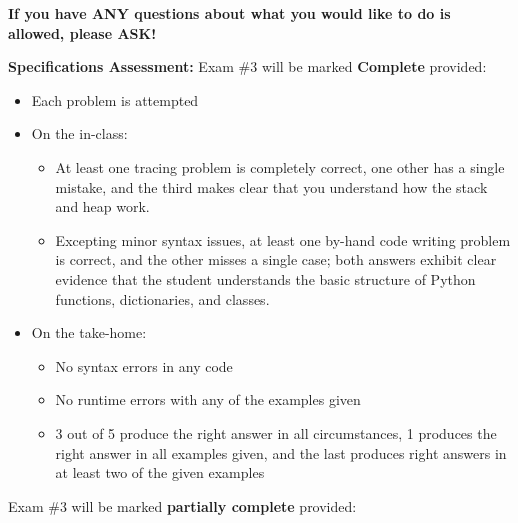 \documentclass{article}
\newcommand{\vs}{\vspace{0.1in}}
\begin{document}
 \vs

 \textbf{If you have ANY questions about what you would like to do is allowed, please ASK!}

 \vs

 \vs


\textbf{Specifications Assessment:}  Exam \#3 will be marked \textbf{Complete} provided:

\begin{itemize}
\item	Each problem is attempted
\item	On the in-class:
\begin{itemize}
\item	At least one tracing problem is completely correct, one other has a single mistake, and the third makes clear that you understand how the stack and heap work.
\item  Excepting minor syntax issues, at least one by-hand code writing problem is correct, and the other misses a single case; both answers exhibit clear evidence that the student understands the basic structure of Python functions, dictionaries, and classes.
\end{itemize}
\item	On the take-home:
\begin{itemize}
\item	No syntax errors in any code
\item	No runtime errors with any of the examples given
\item	3 out of 5 produce the right answer in all circumstances, 1 produces the right answer in all examples given, and the last produces right answers in at least two of the given examples
\end{itemize}
\end{itemize}
Exam \#3 will be marked \textbf{partially complete} provided:
\end{document}

